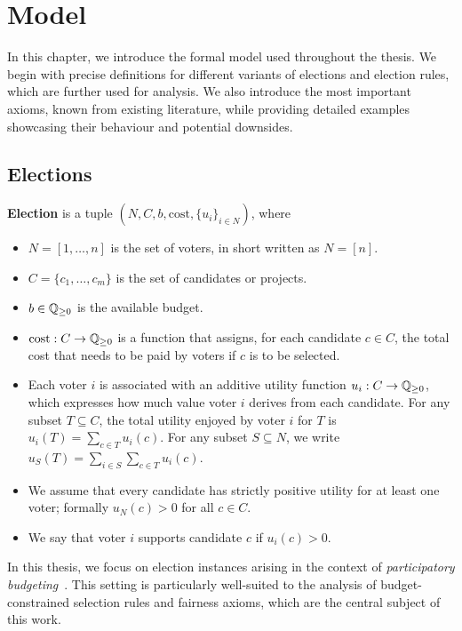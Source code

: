 \chapter{Model}\label{chap:1}
In this chapter, we introduce the formal model used throughout the thesis. We begin with precise definitions for different variants of elections and election rules, which are further used for analysis. We also introduce the most important axioms, known from existing literature, while providing detailed examples showcasing their behaviour and potential downsides.
\section{Elections}
\begin{definition}
\textbf{Election} is a tuple $(N, C, b, \text{cost}, \{u_i\}_{i\in N})$, where
\begin{itemize}
    \item $N = [1,\dots, n]$ is the set of voters, in short written as $N=[n]$.
    \item $C=\{c_1,\dots,c_m\}$ is the set of candidates or projects.
    \item $b\in \mathbb{Q}_{\ge 0}$ is the available budget.
    \item $\text{cost} : C \to \mathbb{Q}_{\ge 0}$ is a function that assigns, for each candidate $c\in C$, the total cost that needs to be paid by voters if $c$ is to be selected.
    \item Each voter $i$ is associated with an additive utility function $u_i : C \to \mathbb{Q}_{\ge 0}$, which expresses how much value voter $i$ derives from each candidate. For any subset $T\subseteq C$, the total utility enjoyed by voter $i$ for $T$ is $u_i(T)=\sum_{c\in T}u_i(c)$. For any subset $S\subseteq N$, we write $u_S(T)=\sum_{i\in S}\sum_{c\in T}u_i(c)$.
    \item We assume that every candidate has strictly positive utility for at least one voter; formally $u_N(c)>0 $ for all $c\in C$.
    \item We say that voter $i$ supports candidate $c$ if $u_i(c)>0$.
\end{itemize}
\end{definition}
In this thesis, we focus on election instances arising in the context of \emph{participatory budgeting}~\cite{ParticipatoryBudgeting}. This setting is particularly well-suited to the analysis of budget-constrained selection rules and fairness axioms, which are the central subject of this work.

